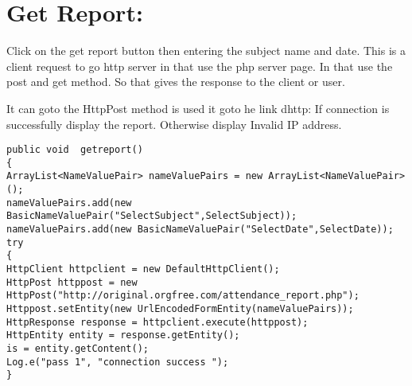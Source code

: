 \section{Get Report:}
Click on the get report button then entering the subject name and date. This is a client request to go http server in that use the php server page. In that use the post and get method. So that gives the response to the client or user.

It can goto the HttpPost method is used it goto he link dhttp: If connection is successfully display the report. Otherwise display Invalid IP address.

\begin{lstlisting}
public void  getreport()
{
ArrayList<NameValuePair> nameValuePairs = new ArrayList<NameValuePair>();
nameValuePairs.add(new BasicNameValuePair("SelectSubject",SelectSubject));
nameValuePairs.add(new BasicNameValuePair("SelectDate",SelectDate));
try
{
HttpClient httpclient = new DefaultHttpClient();
HttpPost httppost = new HttpPost("http://original.orgfree.com/attendance_report.php");
Httppost.setEntity(new UrlEncodedFormEntity(nameValuePairs));
HttpResponse response = httpclient.execute(httppost);
HttpEntity entity = response.getEntity();
is = entity.getContent();
Log.e("pass 1", "connection success ");
}
\end{lstlisting}


